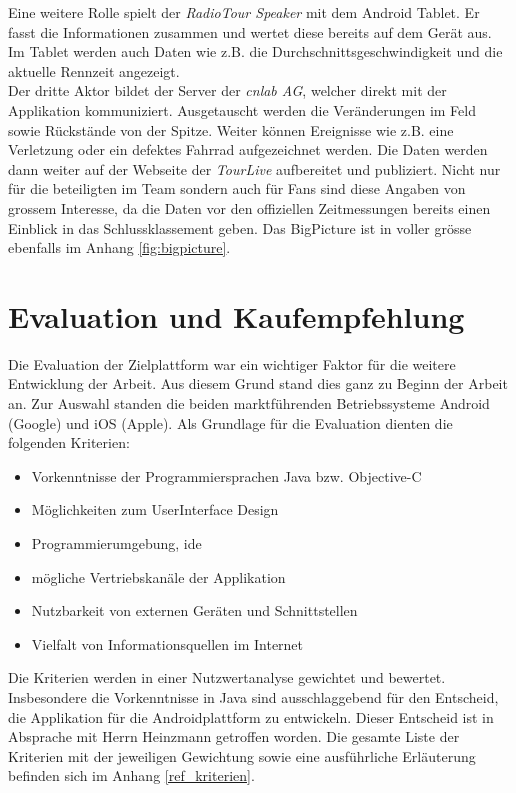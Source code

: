 Eine weitere Rolle spielt der \textit{RadioTour Speaker} mit dem Android Tablet. Er fasst die Informationen zusammen und wertet diese bereits auf dem Gerät aus. Im Tablet werden auch Daten wie z.B. die Durchschnittsgeschwindigkeit und die aktuelle Rennzeit angezeigt.
\\

Der dritte Aktor bildet der Server der \textit{cnlab AG}, welcher direkt mit der Applikation kommuniziert. Ausgetauscht werden die Veränderungen im Feld sowie Rückstände von der Spitze. Weiter können Ereignisse wie z.B. eine Verletzung oder ein defektes Fahrrad aufgezeichnet werden. Die Daten werden dann weiter auf der Webseite der \textit{TourLive} aufbereitet und publiziert. Nicht nur für die beteiligten im Team sondern auch für Fans sind diese Angaben von grossem Interesse, da die Daten vor den offiziellen Zeitmessungen bereits einen Einblick in das Schlussklassement geben. Das BigPicture ist in voller grösse ebenfalls im Anhang \ref{fig:bigpicture}.

\section{Evaluation und Kaufempfehlung}
Die Evaluation der Zielplattform war ein wichtiger Faktor für die weitere Entwicklung der Arbeit. Aus diesem Grund stand dies ganz zu Beginn der Arbeit an. Zur Auswahl standen die beiden marktführenden Betriebssysteme Android (Google) und iOS (Apple). Als Grundlage für die Evaluation dienten die folgenden Kriterien:
\begin{itemize}
\item Vorkenntnisse der Programmiersprachen Java bzw. Objective-C
\item Möglichkeiten zum UserInterface Design
\item Programmierumgebung, \gls{ide}
\item mögliche Vertriebskanäle der Applikation
\item Nutzbarkeit von externen Geräten und Schnittstellen
\item Vielfalt von Informationsquellen im Internet
\end{itemize}
Die Kriterien werden in einer Nutzwertanalyse gewichtet und bewertet. Insbesondere die Vorkenntnisse in Java sind  ausschlaggebend für den Entscheid, die Applikation für die Androidplattform zu entwickeln. Dieser Entscheid ist in Absprache mit Herrn Heinzmann getroffen worden. Die gesamte Liste der Kriterien mit der jeweiligen Gewichtung sowie eine ausführliche Erläuterung befinden sich im Anhang \ref{ref_kriterien}.
\\

